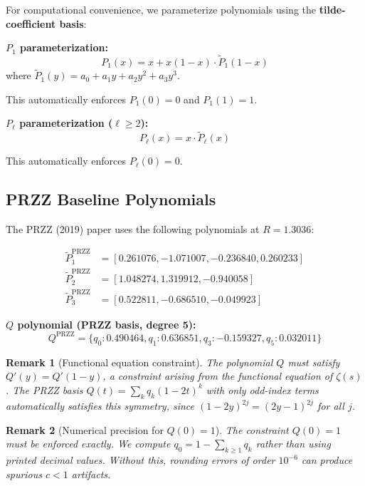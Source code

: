 \documentclass[11pt]{article}
\newtheorem{remark}{Remark}
\begin{document}
For computational convenience, we parameterize polynomials using the \textbf{tilde-coefficient basis}:

\textbf{$P_1$ parameterization:}
\begin{equation}
P_1(x) = x + x(1-x) \cdot \tilde{P}_1(1-x)
\end{equation}
where $\tilde{P}_1(y) = a_0 + a_1 y + a_2 y^2 + a_3 y^3$.

This automatically enforces $P_1(0) = 0$ and $P_1(1) = 1$.

\textbf{$P_\ell$ parameterization ($\ell \geq 2$):}
\begin{equation}
P_\ell(x) = x \cdot \tilde{P}_\ell(x)
\end{equation}

This automatically enforces $P_\ell(0) = 0$.

\subsection{PRZZ Baseline Polynomials}

The PRZZ (2019) paper uses the following polynomials at $R = 1.3036$:

\begin{align}
\tilde{P}_1^{\text{PRZZ}} &= [0.261076, -1.071007, -0.236840, 0.260233] \\
\tilde{P}_2^{\text{PRZZ}} &= [1.048274, 1.319912, -0.940058] \\
\tilde{P}_3^{\text{PRZZ}} &= [0.522811, -0.686510, -0.049923]
\end{align}

\textbf{$Q$ polynomial (PRZZ basis, degree 5):}
\begin{equation}
Q^{\text{PRZZ}} = \{q_0: 0.490464, q_1: 0.636851, q_3: -0.159327, q_5: 0.032011\}
\end{equation}

\begin{remark}[Functional equation constraint]
The polynomial $Q$ must satisfy $Q'(y) = Q'(1-y)$, a constraint arising from
the functional equation of $\zeta(s)$ \cite{Conrey1989,Farmer2025}. The PRZZ basis
$Q(t) = \sum_k q_k (1-2t)^k$ with only odd-index terms automatically satisfies
this symmetry, since $(1-2y)^{2j} = (2y-1)^{2j}$ for all $j$.
\end{remark}

\begin{remark}[Numerical precision for $Q(0) = 1$]
\label{rem:Q-precision}
The constraint $Q(0) = 1$ must be enforced exactly. We compute $q_0 = 1 - \sum_{k \geq 1} q_k$ rather than using printed decimal values. Without this, rounding errors of order $10^{-6}$ can produce spurious $c < 1$ artifacts.
\end{remark}
\end{document}
